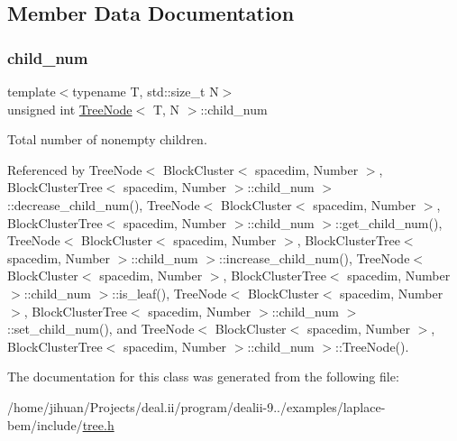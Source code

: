 \subsection{Member Data Documentation}
\mbox{\label{classTreeNode_a9fc9333a3e4e05ae878a844370c17888}} 
\subsubsection{\texorpdfstring{child\+\_\+num}{child\_num}}
{\footnotesize\ttfamily template$<$typename T, std\+::size\+\_\+t N$>$ \\
unsigned int \hyperlink{classTreeNode}{Tree\+Node}$<$ T, N $>$\+::child\+\_\+num\hspace{0.3cm}{\ttfamily [private]}}

Total number of nonempty children. 

Referenced by Tree\+Node$<$ Block\+Cluster$<$ spacedim, Number $>$, Block\+Cluster\+Tree$<$ spacedim, Number $>$\+::child\+\_\+num $>$\+::decrease\+\_\+child\+\_\+num(), Tree\+Node$<$ Block\+Cluster$<$ spacedim, Number $>$, Block\+Cluster\+Tree$<$ spacedim, Number $>$\+::child\+\_\+num $>$\+::get\+\_\+child\+\_\+num(), Tree\+Node$<$ Block\+Cluster$<$ spacedim, Number $>$, Block\+Cluster\+Tree$<$ spacedim, Number $>$\+::child\+\_\+num $>$\+::increase\+\_\+child\+\_\+num(), Tree\+Node$<$ Block\+Cluster$<$ spacedim, Number $>$, Block\+Cluster\+Tree$<$ spacedim, Number $>$\+::child\+\_\+num $>$\+::is\+\_\+leaf(), Tree\+Node$<$ Block\+Cluster$<$ spacedim, Number $>$, Block\+Cluster\+Tree$<$ spacedim, Number $>$\+::child\+\_\+num $>$\+::set\+\_\+child\+\_\+num(), and Tree\+Node$<$ Block\+Cluster$<$ spacedim, Number $>$, Block\+Cluster\+Tree$<$ spacedim, Number $>$\+::child\+\_\+num $>$\+::\+Tree\+Node().



The documentation for this class was generated from the following file\+:\begin{DoxyCompactItemize}
\item 
/home/jihuan/\+Projects/deal.\+ii/program/dealii-\/9../examples/laplace-\/bem/include/\hyperlink{tree_8h}{tree.\+h}\end{DoxyCompactItemize}
